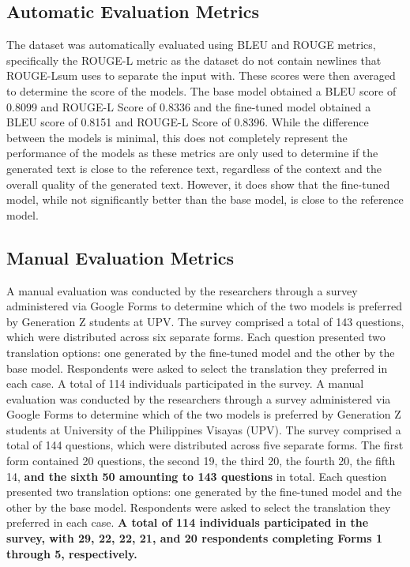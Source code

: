 \subsection{Automatic Evaluation Metrics}
The dataset was automatically evaluated using BLEU and ROUGE metrics, specifically the ROUGE-L metric as the dataset do not contain newlines that ROUGE-Lsum uses to separate the input with. These scores were then averaged to determine the score of the models. The base model obtained a BLEU score of 0.8099 and ROUGE-L Score of 0.8336 and the fine-tuned model obtained a BLEU score of 0.8151 and ROUGE-L Score of 0.8396. While the difference between the models is minimal, this does not completely represent the performance of the models as these metrics are only used to determine if the generated text is close to the reference text, regardless of the context and the overall quality of the generated text. However, it does show that the fine-tuned model, while not significantly better than the base model, is close to the reference model.

\subsection{Manual Evaluation Metrics}
A manual evaluation was conducted by the researchers through a survey administered via Google Forms to determine which of the two models is preferred by Generation Z students at UPV. The survey comprised a total of 143 questions, which were distributed across six separate forms. Each question presented two translation options: one generated by the fine-tuned model and the other by the base model. Respondents were asked to select the translation they preferred in each case. A total of 114 individuals participated in the survey. 
A manual evaluation was conducted by the researchers through a survey administered via Google Forms to determine which of the two models is preferred by Generation Z students at University of the Philippines Visayas (UPV). The survey comprised a total of 144 questions, which were distributed across five separate forms. The first form contained 20 questions, the second 19, the third 20, the fourth 20, the fifth 14, \textbf{and the sixth 50 amounting to 143 questions} in total. Each question presented two translation options: one generated by the fine-tuned model and the other by the base model. Respondents were asked to select the translation they preferred in each case.\textbf{ A total of 114 individuals participated in the survey, with 29, 22, 22, 21, and 20 respondents completing Forms 1 through 5, respectively. }

